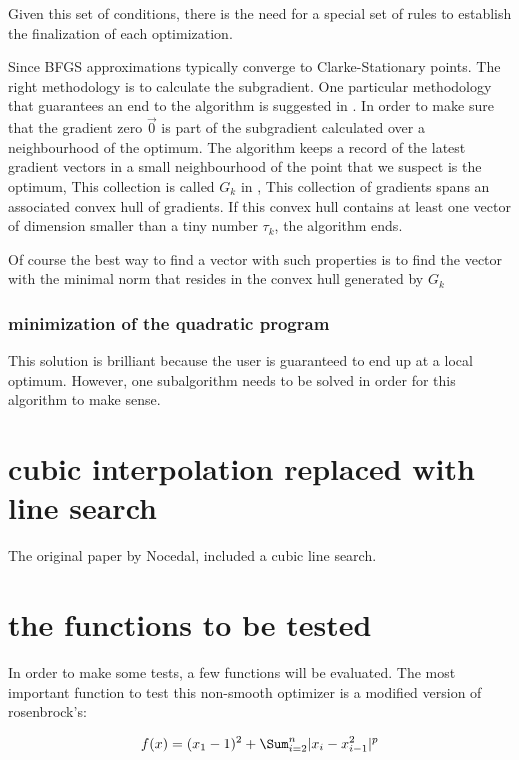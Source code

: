 Given this set of conditions, there is the need for a special set of rules to establish the finalization of each optimization.

Since BFGS approximations typically converge to Clarke-Stationary points. The right methodology is to calculate the subgradient. One particular methodology that guarantees an end to the algorithm is suggested in \citep{overtonlewis}.  In order to make sure that the gradient zero $\vec{0}$ is part of the subgradient calculated over a neighbourhood of the optimum.
The algorithm keeps a record of the latest gradient vectors in a small neighbourhood of the point that we suspect is the optimum, This collection is called $G_k$ in \citep{overtonlewis}, This collection of gradients spans an associated convex hull of gradients. If this convex hull contains at least one vector of dimension smaller than a tiny number $\tau_k$, the algorithm ends.

Of course the best way to find a vector with such properties is to find the vector with the minimal norm that resides in the convex hull generated by $G_k$

\subsubsection{minimization of the quadratic program}

This solution is brilliant because the user is guaranteed to end up at a local optimum.  However, one subalgorithm needs to be solved in order for this algorithm to make sense.

\section{cubic interpolation replaced with line search}

The original paper by Nocedal\citep{Nocedal}, included a cubic line search.

\section{the functions to be tested}

In order to make some tests, a few functions will be evaluated. The most important function to test this non-smooth optimizer is a modified version of rosenbrock's:

\begin{equation}
    f(x) = (x_1 - 1)^2 + \Sum_{i = 2}^n |x_i - x_{i - 1}^2|^p
\end{equation}

